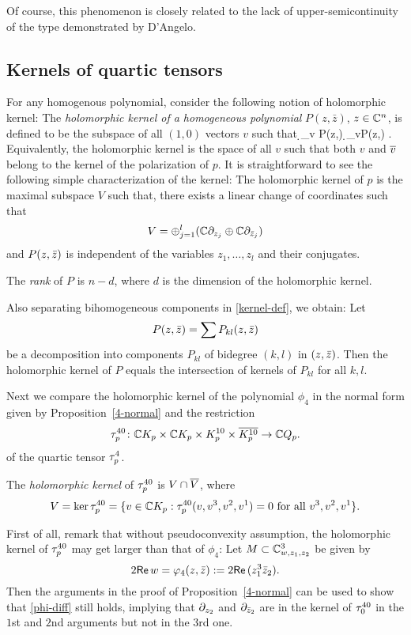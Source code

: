 \documentclass[12pt]{amsart}
\begin{document}
Of course, this phenomenon is closely related to the lack of upper-semicontinuity of the type
demonstrated by D'Angelo.
\ee



\subsection{Kernels of quartic tensors}
For any homogenous polynomial, consider the following notion of
holomorphic kernel:
\bd
	The {\em holomorphic kernel of a homogeneous polynomial} 
	$P(z,\bar z)$, $z\in {\mathbb{C}}^n$, 
	is defined to be the subspace of all $(1,0)$ vectors $v$ such that
	\beq{}
		\d_v P(z,\z) \equiv \d_{\1v}P(z,\z) .
	\eeq
	Equivalently, the holomorphic kernel is the space of all $v$
	such that both $v$ and $\overline{v}$ belong to the kernel 
	of the polarization of $p$.
\ed
It is straightforward to see the following simple characterization of the kernel:
\bl{}
	The holomorphic kernel of $p$ is the maximal subspace $V$ such that,
	there exists a linear change of coordinates such that
	$$V= \oplus_{j=1}^l ({\mathbb{C}} \partial_{z_j} \oplus {\mathbb{C}} \partial_{{\bar z}_j})$$
	and $P(z,{\bar z})$ is independent of the variables $z_1,\ldots, z_l$ and their conjugates.
\el

\bd{}
	The {\em rank} of $P$ is $n-d$, where $d$ is the dimension of the holomorphic kernel.
\ed

Also separating bihomogeneous components in \eqref{kernel-def}, we obtain:
\bl
	Let 
	$$
		P(z,{\bar z})=\sum P_{kl}(z,{\bar z})
	$$ 
	be a decomposition into components $P_{kl}$ of bidegree $(k,l)$ in $(z,{\bar z})$.
	Then the holomorphic kernel of $P$ equals the intersection of kernels of $P_{kl}$ for all $k,l$.
\el

Next we compare the holomorphic kernel of the polynomial $\phi_4$
in the normal form given by Proposition~\ref{4-normal}
and the restriction 
$$
	\tau^{40}_p \colon {\mathbb{C}} K_p \times {\mathbb{C}} K_p \times K^{10}_p \times \overline{K^{10}_p} \to {\mathbb{C}} Q_p.
$$
of the quartic tensor $\tau^4_p$.

\bd
The {\em holomorphic kernel} of $\tau^{40}_p$ is 
$V\cap \overline{V}$, where
$$
	V = \ker \tau^{40}_p = \{ v\in {\mathbb{C}} K_p : 
		\tau^{40}_p(v, v^3, v^2, v^1) =0
		\text{ for all }
		v^3, v^2, v^1\}.
$$
\ed

First of all, remark that 
without pseudoconvexity assumption,
the holomorphic kernel of $\tau^{40}_p$
may get larger than that of $\phi_4$:
\be{}
Let $M\subset {\mathbb{C}}^3_{w, z_1, z_2}$ be given by
$$
	2{\sf Re}\, w = \varphi_4(z,{\bar z}):= 2{\sf Re}\, (z_1^3 {\bar z}_2).
$$
Then the arguments in the proof of Proposition~\ref{4-normal}
can be used to show that \eqref{phi-diff} still holds,
implying that $\partial_{z_2}$ and $\partial_{{\bar z}_2}$
are in the kernel of $\tau^{40}_0$
in the $1$st and $2$nd arguments
but not in the $3$rd one.
\ee
\end{document}
